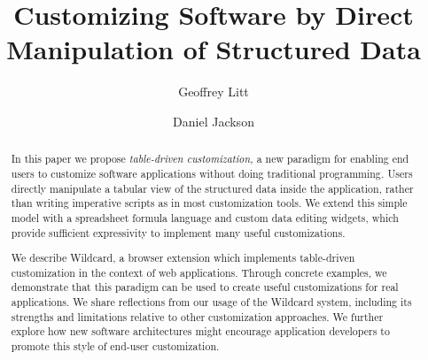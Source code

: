 \documentclass[sigplan,10pt,anonymous,review]{acmart}
\begin{document}
\title{Customizing Software by Direct Manipulation of Structured Data}


\author{Geoffrey Litt}

\author{Daniel Jackson}


\begin{abstract}
  In this paper we propose \emph{table-driven customization,} a new
  paradigm for enabling end users to customize software applications
  without doing traditional programming\emph{.} Users directly
  manipulate a tabular view of the structured data inside the
  application, rather than writing imperative scripts as in most
  customization tools. We extend this simple model with a spreadsheet
  formula language and custom data editing widgets, which provide
  sufficient expressivity to implement many useful customizations.

  We describe Wildcard, a browser extension which implements
  table-driven customization in the context of web applications. Through
  concrete examples, we demonstrate that this paradigm can be used to
  create useful customizations for real applications. We share
  reflections from our usage of the Wildcard system, including its
  strengths and limitations relative to other customization approaches.
  We further explore how new software architectures might encourage
  application developers to promote this style of end-user
  customization.
\end{abstract}
\end{document}
